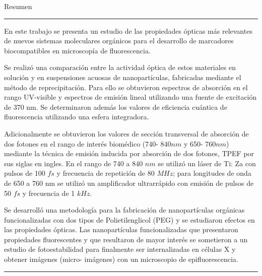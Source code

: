 \begin{vcenterpage}
{\LARGE{\sc Resumen}}

\noindent\rule[2pt]{\textwidth}{0.5pt}
En este trabajo se presenta un estudio de las propiedades \'opticas m\'as relevantes de nuevos sistemas moleculares org\'anicos para el desarrollo de marcadores biocompatibles en microscop\'ia de fluorescencia.

Se realiz\'o una comparaci\'on entre la actividad \'optica de estos materiales en soluci\'on y en suspensiones acuosas de nanopart\'iculas, fabricadas mediante el m\'etodo de reprecipitaci\'on. Para ello se obtuvieron espectros de absorci\'on en el rango UV-visible y espectros de emisi\'on lineal utilizando una fuente de excitaci\'on de 370 nm. Se determinaron adem\'as los valores de eficiencia cu\'antica de fluorescencia utilizando una esfera integradora. 

Adicionalmente se obtuvieron los valores de secci\'on transversal de absorci\'on de dos fotones en el rango de inter\'es biom\'edico (740- 840$nm$ y 650- 760$nm$) mediante la t\'ecnica de emisi\'on inducida por absorci\'on de dos fotones, TPEF por sus siglas en ingles. En el rango de 740 a 840 $nm$ se utiliz\'o un l\'aser de Ti: Za con pulsos de 100 $fs$ y frecuencia de repetici\'on de 80 $MHz$; para longitudes de onda de 650 a 760 nm se utiliz\'o un amplificador ultrarr\'apido con emisi\'on de pulsos de 50 $fs$ y frecuencia de 1 $kHz$.
	
Se desarroll\'o una metodolog\'ia para la fabricaci\'on de nanopart\'iculas org\'anicas funcionalizadas con dos tipos de Polietilenglicol (PEG) y se estudiaron efectos en las propiedades \'opticas. Las nanopart\'iculas funcionalizadas que presentaron propiedades fluorescentes y que resultaron de mayor inter\'es se sometieron a un estudio de fotoestabilidad para finalmente ser internalizadas en c\'elulas X y obtener im\'agenes (micro- im\'agenes) con un microscopio de epifluorescencia.


\noindent\rule[2pt]{\textwidth}{0.5pt}
\end{vcenterpage}
